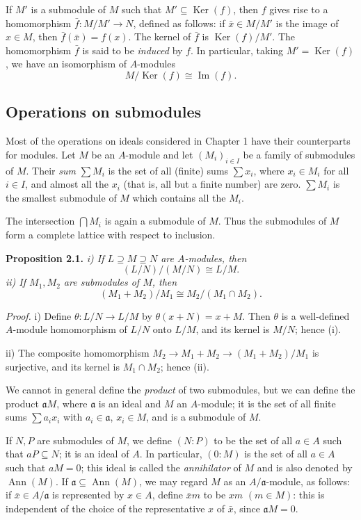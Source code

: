 If \(M'\) is a submodule of \(M\) such that \(M'\subseteq\operatorname{Ker}(f)\), then \(f\) gives rise to a homomorphism \(\bar f:M/M'\to N\), defined as follows: if \(\bar x\in M/M'\) is the image of \(x\in M\), then \(\bar f(\bar x)=f(x)\). The kernel of \(\bar f\) is \(\operatorname{Ker}(f)/M'\). The homomorphism \(\bar f\) is said to be \emph{induced} by \(f\). In particular, taking \(M'=\operatorname{Ker}(f)\), we have an isomorphism of \(A\)-modules
\[
M/\operatorname{Ker}(f)\cong\operatorname{Im}(f).
\]

\subsection{Operations on submodules}

Most of the operations on ideals considered in Chapter 1 have their counterparts for modules. Let \(M\) be an \(A\)-module and let \((M_i)_{i\in I}\) be a family of submodules of \(M\). Their \emph{sum} \(\sum M_i\) is the set of all (finite) sums \(\sum x_i\), where \(x_i\in M_i\) for all \(i\in I\), and almost all the \(x_i\) (that is, all but a finite number) are zero. \(\sum M_i\) is the smallest submodule of \(M\) which contains all the \(M_i\).

The intersection \(\bigcap M_i\) is again a submodule of \(M\). Thus the submodules of \(M\) form a complete lattice with respect to inclusion.

\noindent\textbf{Proposition 2.1.} \emph{i) If \(L\supseteq M\supseteq N\) are \(A\)-modules, then}
\[
(L/N)/(M/N)\cong L/M.
\]
\emph{ii) If \(M_1,M_2\) are submodules of \(M\), then}
\[
(M_1+M_2)/M_1\cong M_2/(M_1\cap M_2).
\]

\noindent\emph{Proof.} i) Define \(\theta:L/N\to L/M\) by \(\theta(x+N)=x+M\). Then \(\theta\) is a well-defined \(A\)-module homomorphism of \(L/N\) onto \(L/M\), and its kernel is \(M/N\); hence (i).

ii) The composite homomorphism \(M_2\to M_1+M_2\to(M_1+M_2)/M_1\) is surjective, and its kernel is \(M_1\cap M_2\); hence (ii). \proofbox

We cannot in general define the \emph{product} of two submodules, but we can define the product \(\mathfrak aM\), where \(\mathfrak a\) is an ideal and \(M\) an \(A\)-module; it is the set of all finite sums \(\sum a_i x_i\) with \(a_i\in\mathfrak a\), \(x_i\in M\), and is a submodule of \(M\).

If \(N,P\) are submodules of \(M\), we define \((N:P)\) to be the set of all \(a\in A\) such that \(aP\subseteq N\); it is an ideal of \(A\). In particular, \((0:M)\) is the set of all \(a\in A\) such that \(aM=0\); this ideal is called the \emph{annihilator} of \(M\) and is also denoted by \(\operatorname{Ann}(M)\). If \(\mathfrak a\subseteq\operatorname{Ann}(M)\), we may regard \(M\) as an \(A/\mathfrak a\)-module, as follows: if \(\bar x\in A/\mathfrak a\) is represented by \(x\in A\), define \(\bar x m\) to be \(xm\) \((m\in M)\): this is independent of the choice of the representative \(x\) of \(\bar x\), since \(\mathfrak aM=0\).

